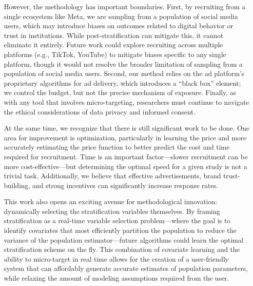 \documentclass[letterpaper,12pt]{article}
\theoremstyle{proposition}
\begin{document}
However, the methodology has important boundaries. First, by recruiting from a single ecosystem like Meta, we are sampling from a population of social media users, which may introduce biases on outcomes related to digital behavior or trust in institutions. While post-stratification can mitigate this, it cannot eliminate it entirely. Future work could explore recruiting across multiple platforms (e.g., TikTok, YouTube) to mitigate biases specific to any single platform, though it would not resolve the broader limitation of sampling from a population of social media users. Second, our method relies on the ad platform's proprietary algorithms for ad delivery, which introduces a ``black box'' element; we control the budget, but not the precise mechanism of exposure. Finally, as with any tool that involves micro-targeting, researchers must continue to navigate the ethical considerations of data privacy and informed consent.

At the same time, we recognize that there is still significant work to be done. One area for improvement is optimization, particularly in learning the price and more accurately estimating the price function to better predict the cost and time required for recruitment. Time is an important factor—slower recruitment can be more cost-effective—but determining the optimal speed for a given study is not a trivial task. Additionally, we believe that effective advertisements, brand trust-building, and strong incentives can significantly increase response rates.

This work also opens an exciting avenue for methodological innovation: dynamically selecting the stratification variables themselves. By framing stratification as a real-time variable selection problem—where the goal is to identify covariates that most efficiently partition the population to reduce the variance of the population estimator—future algorithms could learn the optimal stratification scheme on the fly. This combination of covariate learning and the ability to micro-target in real time allows for the creation of a user-friendly system that can affordably generate accurate estimates of population parameters, while relaxing the amount of modeling assumptions required from the user. 



\end{document}

